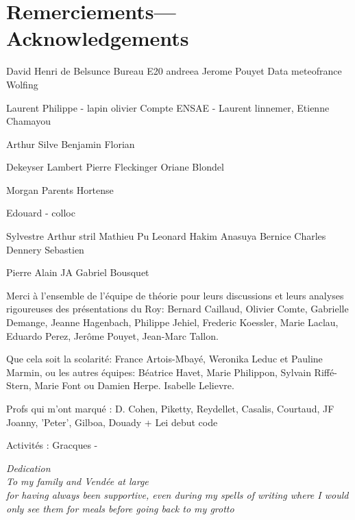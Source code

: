 \chapter*{Remerciements---Acknowledgements}
David
Henri de Belsunce
Bureau E20 andreea
Jerome Pouyet
Data meteofrance
Wolfing

Laurent Philippe - lapin
olivier Compte
ENSAE - Laurent linnemer, Etienne Chamayou

Arthur Silve
Benjamin
Florian

Dekeyser
Lambert
Pierre Fleckinger
Oriane Blondel

Morgan 
Parents
Hortense

Edouard - colloc 

Sylvestre
Arthur stril
Mathieu 
Pu 
Leonard
Hakim
Anasuya 
Bernice
Charles Dennery
Sebastien

Pierre Alain
JA 
Gabriel Bousquet


Merci à l’ensemble de l’équipe de théorie pour leurs discussions et leurs analyses rigoureuses des présentations du Roy: Bernard Caillaud, Olivier Comte, Gabrielle Demange, Jeanne Hagenbach, Philippe Jehiel, Frederic Koessler, Marie Laclau, Eduardo Perez, Jerôme Pouyet, Jean-Marc Tallon.

Que cela soit la scolarité: France Artois-Mbayé, Weronika Leduc et Pauline Marmin, ou les autres équipes: Béatrice Havet, Marie Philippon, Sylvain Riffé-Stern, Marie Font ou Damien Herpe. Isabelle Lelievre. 

Profs qui m'ont marqué : D. Cohen, Piketty, Reydellet, Casalis, Courtaud, JF Joanny, 'Peter', Gilboa, Douady + Lei debut code


Activités : Gracques - 



\cleardoublepage
\thispagestyle{empty}
\vspace*{6cm}
\begin{flushright}
\emph{Dedication\\
To my family and Vendée at large\\
for having always been supportive, even during my spells of writing where I would only see them for meals before going back to my grotto\\
}
\end{flushright}
\cleardoublepage